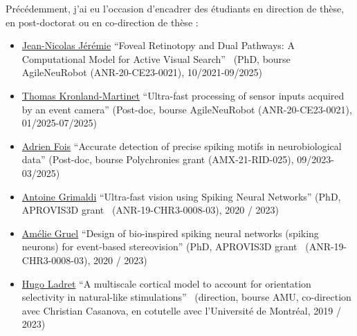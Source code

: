 \documentclass[10pt,french,a4paper,twoside]{article}%
\begin{document}
Précédemment, j'ai eu l'occasion d'encadrer des étudiants en direction de thèse, en post-doctorat ou en co-direction de thèse :
\begin{itemize}
	\item \href{https://laurentperrinet.github.io/author/jean-nicolas-jeremie/}{Jean-Nicolas Jérémie} ``Foveal Retinotopy and Dual Pathways: A Computational Model for Active Visual Search''~\textcite{Jeremie25thesis} (PhD, bourse AgileNeuRobot (ANR-20-CE23-0021), 10/2021-09/2025)
	\item \href{https://laurentperrinet.github.io/author/thomas-kronland-martinet/}{Thomas Kronland-Martinet} ``Ultra-fast processing of sensor inputs acquired by an event camera'' (Post-doc, bourse AgileNeuRobot (ANR-20-CE23-0021), 01/2025-07/2025)
	\item \href{https://laurentperrinet.github.io/author/adrien-fois/}{Adrien Fois} ``Accurate detection of precise spiking motifs in neurobiological data'' (Post-doc, bourse Polychronies grant (AMX-21-RID-025), 09/2023-03/2025)
	\item \href{https://laurentperrinet.github.io/author/antoine-grimaldi/}{Antoine Grimaldi} ``Ultra-fast vision using Spiking Neural Networks'' (PhD, APROVIS3D grant~\textcite{Grimaldi24thesis} (ANR-19-CHR3-0008-03), 2020 / 2023)
	\item \href{https://laurentperrinet.github.io/author/amélie-gruel/}{Amélie Gruel} ``Design of bio-inspired spiking neural networks (spiking neurons) for event-based stereovision'' (PhD, APROVIS3D grant~\textcite{Gruel23thesis} (ANR-19-CHR3-0008-03), 2020 / 2023)
	\item \href{https://laurentperrinet.github.io/author/hugo-ladret/}{Hugo Ladret} ``A multiscale cortical model to account for orientation selectivity in natural-like stimulations''~\textcite{Ladret24thesis}  (direction, bourse AMU, co-direction avec Christian Casanova, en cotutelle avec l'Université de Montréal, 2019 / 2023)

\end{itemize}
\end{document}
